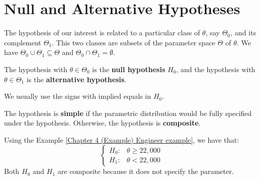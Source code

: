 \documentclass{huhtakm-template-book-v2}
\begin{document}
\section{Null and Alternative Hypotheses}
The hypothesis of our interest is related to a particular class of $\theta$, say $\Theta_{0}$, and its complement $\Theta_{1}$. This two classes are subsets of the parameter space $\Theta$ of $\theta$. We have $\Theta_{0}\cup\Theta_{1}\subseteq\Theta$ and $\Theta_{0}\cap\Theta_{1}=\emptyset$.
\begin{defn}
	The hypothesis with $\theta\in\Theta_{0}$ is the \textbf{null hypothesis} $H_{0}$, and the hypothesis with $\theta\in\Theta_{1}$ is the \textbf{alternative hypothesis}.
\end{defn}
\begin{rem}
	We usually use the signs with implied equals in $H_{0}$.
\end{rem}
\begin{defn}
	The hypothesis is \textbf{simple} if the parametric distribution would be fully specified under the hypothesis. Otherwise, the hypothesis is \textbf{composite}.
\end{defn}
\begin{eg}
	Using the Example \ref{Chapter 4 (Example) Engineer example}, we have that:
	\begin{equation*}
		\begin{cases}
			H_{0}: & \theta\geq 22,000\\
			H_{1}: & \theta<22,000
		\end{cases}
	\end{equation*}
	Both $H_{0}$ and $H_{1}$ are composite because it does not specify the parameter.
\end{eg}
\end{document}
